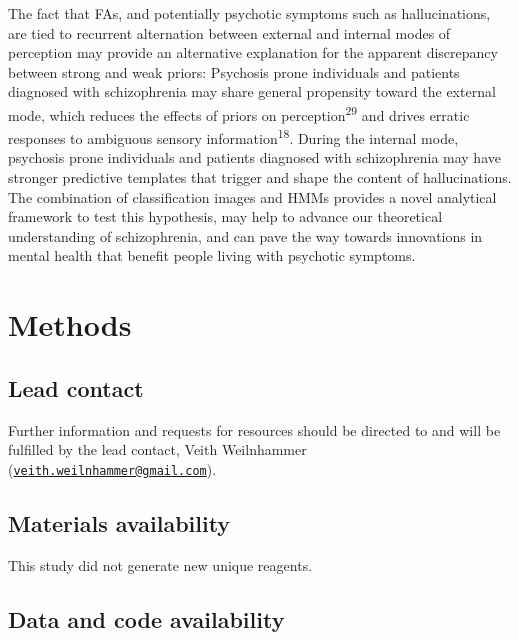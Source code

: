 \documentclass[
]{article}
\begin{document}
The fact that FAs, and potentially psychotic symptoms such as
hallucinations, are tied to recurrent alternation between external and
internal modes of perception may provide an alternative explanation for
the apparent discrepancy between strong and weak priors: Psychosis prone
individuals and patients diagnosed with schizophrenia may share general
propensity toward the external mode, which reduces the effects of priors
on perception\textsuperscript{29} and drives erratic responses to
ambiguous sensory information\textsuperscript{18}. During the internal
mode, psychosis prone individuals and patients diagnosed with
schizophrenia may have stronger predictive templates that trigger and
shape the content of hallucinations. The combination of classification
images and HMMs provides a novel analytical framework to test this
hypothesis, may help to advance our theoretical understanding of
schizophrenia, and can pave the way towards innovations in mental health
that benefit people living with psychotic symptoms.

\newpage

\hypertarget{methods}{%
\section{Methods}\label{methods}}

\hypertarget{lead-contact}{%
\subsection{Lead contact}\label{lead-contact}}

Further information and requests for resources should be directed to and
will be fulfilled by the lead contact, Veith Weilnhammer
(\href{mailto:veith.weilnhammer@gmail.com}{\nolinkurl{veith.weilnhammer@gmail.com}}).

\hypertarget{materials-availability}{%
\subsection{Materials availability}\label{materials-availability}}

This study did not generate new unique reagents.

\hypertarget{data-and-code-availability}{%
\subsection{Data and code
availability}\label{data-and-code-availability}}
\end{document}

